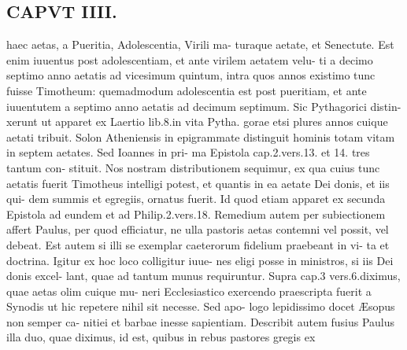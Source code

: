 \documentclass{article}
\begin{document}
\begin{pages}
\section*{CAPVT  IIII. }
\marginpar{[ p.229 ]}haec aetas, a Pueritia, Adolescentia, Virili ma- turaque aetate, et Senectute. Est enim iuuentus post adolescentiam, et ante virilem aetatem velu- ti a decimo septimo anno aetatis ad vicesimum quintum, intra quos annos existimo tunc fuisse Timotheum: quemadmodum adolescentia est post pueritiam, et ante iuuentutem a septimo anno aetatis ad decimum septimum. Sic Pythagorici distin- xerunt ut apparet ex Laertio lib.8.in vita Pytha. gorae etsi plures annos cuique aetati tribuit. Solon Atheniensis in epigrammate distinguit hominis totam vitam in septem aetates. Sed Ioannes in pri- ma Epistola cap.2.vers.13. et 14. tres tantum con- stituit. Nos nostram distributionem sequimur, ex qua cuius tunc aetatis fuerit Timotheus intelligi potest, et quantis in ea aetate Dei donis, et iis qui- dem summis et egregiis, ornatus fuerit. Id quod etiam apparet ex secunda Epistola ad eundem et ad Philip.2.vers.18. Remedium autem per subiectionem affert Paulus, per quod efficiatur, ne ulla pastoris aetas contemni vel possit, vel debeat. Est autem si illi se exemplar caeterorum fidelium praebeant in vi- ta et doctrina. Igitur ex hoc loco colligitur iuue- nes eligi posse in ministros, si iis Dei donis excel- lant, quae ad tantum munus requiruntur. Supra cap.3 vers.6.diximus, quae aetas olim cuique mu- neri Ecclesiastico exercendo praescripta fuerit a Synodis ut hic repetere nihil sit necesse. Sed apo- logo lepidissimo docet Æsopus non semper ca- nitiei et barbae inesse sapientiam. Describit autem fusius Paulus illa duo, quae diximus, id est, quibus in rebus pastores gregis ex 

\end{pages}
\end{document}
